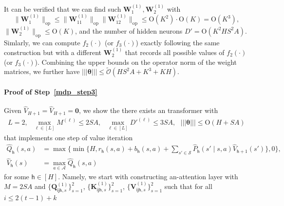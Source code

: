 \documentclass[10pt]{article}
\newcommand{\lops}[1]{\|{#1}\|_{\mathrm{op}}}
\newcommand{\<}{\left\langle}
\renewcommand{\>}{\right\rangle}
\renewcommand{\bQ}{\mathbf{Q}}
\newcommand{\lth}{{(\ell)}}
\newcommand{\bzero}{{\mathbf 0}}
\newcommand{\nrmp}[1]{{\left|\!\left|\!\left|{#1}\right|\!\right|\!\right|}}
\newcommand{\tcO}{{\tilde{\mathcal O}}}
\newcommand{\state}{{s}}
\newcommand{\action}{{a}}
\newcommand{\estreward}{{{r}}}
\newcommand{\Numepi}{{K}}
\newcommand{\horizon}{{H}}
\newcommand{\statesp}{{\mathcal{S}}}
\newcommand{\actionsp}{{\mathcal{A}}}
\renewcommand{\horizon}{{H}}
\newcommand{\estbonus}{{b}}
\newcommand{\esttransit}{\widehat{P}}
\newcommand{\valuefun}{{V}}
\newcommand{\tfpar}{{\btheta}}
\newcommand{\layer}{{L}}
\newcommand{\hidden}{{D'}}
\newcommand{\head}{{M}}
\newcommand{\Numst}{{S}}
\newcommand{\Numact}{{A}}
\newcommand{\Qfun}{{Q}}
\newcommand{\estQfun}{{\widehat{\Qfun}}}
\newcommand{\Vfun}{{\valuefun}}
\newcommand{\estVfun}{{\widehat{\Vfun}}}
\newcommand{\trestVfun}{{\widehat{\Vfun}}}
\newcommand{\conO}{{\mathrm{O}}}
\def\bK{{\mathbf K}}
\def\bQ{{\mathbf Q}}
\def\bV{{\mathbf V}}
\def\bW{{\mathbf W}}
\def\btheta{{\boldsymbol \theta}}
\def\si{{\mathsf{i}}}
\def\sj{{\mathsf{j}}}
\def\sh{{\mathsf{h}}}
\begin{document}
It can be verified that we can find such $\bW_1^{(1)},\bW_2^{(1)}$ with $$\lops{\bW_1^{(1)}}\leq \lops{\bW_{11}^{(1)}}\lops{\bW_{12}^{(1)}}\leq \conO(\Numepi^2)\cdot \conO(\Numepi)=\conO(\Numepi^3),$$ $\lops{\bW_2^{(1)}}\leq \conO(\Numepi)
$, and the number of hidden neurons $\hidden=\conO(\Numepi^2\horizon\Numst^2\Numact)$. Simlarly, we can compute $f_2(\cdot)$ (or $f_3(\cdot)$) exactly following the same construction but with a different $\bW_2^{(1)}$ that records all possible values of  $f_2(\cdot)$ (or $f_3(\cdot)$). Combining the upper bounds on the operator norm of the  weight matrices, we further have $\nrmp{\tfpar}\leq\tcO(\horizon\Numst^2\Numact+\Numepi^3+\Numepi\horizon)$.
\paragraph{Proof of Step~\ref{mdp_step3}} Given $\trestVfun_{\horizon+1}=\estVfun_{\horizon+1}=\bzero$, we show the there exists an transformer with
\begin{align*}
\layer=2,~~~\max_{\ell\in[\layer]}\head^\lth\leq2\Numst\Numact,~~~\max_{\ell\in[\layer]}\hidden^{\lth}\leq3\Numst\Numact,~~~\nrmp{\tfpar}\leq \conO(\horizon+\Numst\Numact)
\end{align*}
that implements one step of value iteration
\begin{align*}
    \estQfun_\sh(\state,\action)&=\max\{\min\{\horizon,\estreward_\sh(\state,\action)+\estbonus_\sh(\state,\action)+\sum_{\state'\in\statesp}\esttransit_\sh(\state'\mid\state,\action)\estVfun_{\sh+1}(\state')\},0\},\\
\estVfun_\sh(\state)&=\max_{\action\in\actionsp}\estQfun_\sh(\state,\action)
\end{align*} for some $\sh\in[\horizon]$.
Namely, we start with constructing an-attention layer with $\head=2\Numst\Numact$ and $\{\bQ_{\si\sj\sh,s}^{(1)}\}^2_{s=1}$, $\{\bK_{\si\sj\sh,s}^{(1)}\}^2_{s=1}$, $\{\bV_{\si\sj\sh,s}^{(1)}\}^2_{s=1}$ such that for all $i\leq 2(t-1)+k$
\end{document}
